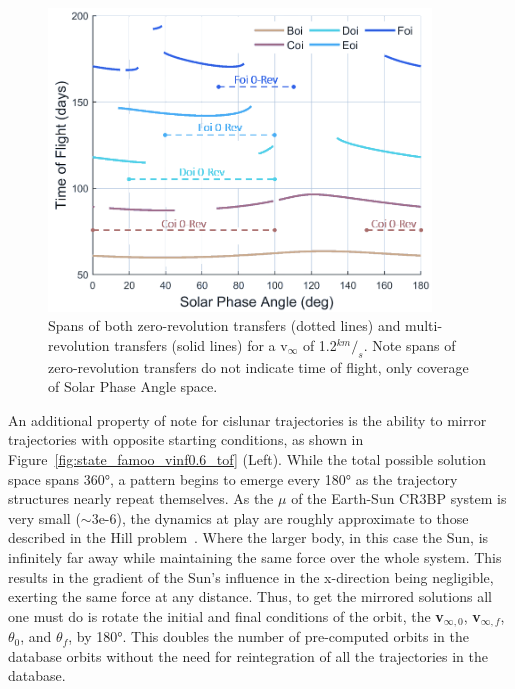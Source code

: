\documentclass[letterpaper, paper,11pt]{AAS}	%
\begin{document}
\begin{figure}[h]
    \centering
    \includegraphics[width=4in]{./etc/spancompare.png}
    \caption{Spans of both zero-revolution transfers (dotted lines) and multi-revolution transfers (solid lines) for a v\(_\infty\) of 1.2\(^{km}/_s\). Note spans of zero-revolution transfers do not indicate time of flight, only coverage of Solar Phase Angle space.}
    \label{fig:tof_comparison}
\end{figure}

An additional property of note for cislunar trajectories is the ability to mirror trajectories with opposite starting conditions, as shown in Figure~\ref{fig:state_famoo_vinf0.6_tof} (Left). While the total possible solution space spans 360°, a pattern begins to emerge every 180° as the trajectory structures nearly repeat themselves. As the \(\mu\) of the Earth-Sun CR3BP system is very small (\(\sim\)3e-6), the dynamics at play are roughly approximate to those described in the Hill problem~\cite{Kalantonis2020}. Where the larger body, in this case the Sun, is infinitely far away while maintaining the same force over the whole system. This results in the gradient of the Sun's influence in the x-direction being negligible, exerting the same force at any distance. Thus, to get the mirrored solutions all one must do is rotate the initial and final conditions of the orbit, the \textbf{v}\(_{\infty, 0}\), \textbf{v}\(_{\infty, f}\), \(\theta_0\), and \(\theta_f\), by 180°. This doubles the number of pre-computed orbits in the database orbits without the need for reintegration of all the trajectories in the database.
\end{document}
